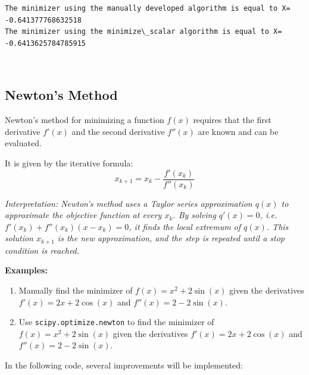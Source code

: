 \documentclass[11pt]{article}
\begin{document}
    \begin{Verbatim}[commandchars=\\\{\}]
The minimizer using the manually developed algorithm is equal to X=
-0.641377768632518
The minimizer using the minimize\_scalar algorithm is equal to X=
-0.6413625784785915
    \end{Verbatim}

    \begin{center}
    \end{center}
    { \hspace*{\fill} \\}
    
    \subsection{Newton's Method}\label{newtons-method}

Newton's method for minimizing a function \(f(x)\) requires that the
first derivative \(f'(x)\) and the second derivative \(f''(x)\) are
known and can be evaluated.

It is given by the iterative formula: \[
x_{k+1} = x_k - \frac{f'(x_k)}{f''(x_k)}
\]

\emph{Interpretation: Newton's method uses a Taylor series approximation
\(q(x)\) to approximate the objective function at every \(x_k\). By
solving \(q'(x) = 0\), i.e.~\(f'(x_k) + f''(x_k)(x - x_k) = 0\), it
finds the local extremum of \(q(x)\). This solution \(x_{k+1}\) is the
new approximation, and the step is repeated until a stop condition is
reached.}

    \textbf{Examples:}

\begin{enumerate}
\def\labelenumi{\arabic{enumi}.}
\item
  Manually find the minimizer of \(f(x) = x^2 + 2\sin(x)\) given the
  derivatives \(f'(x) = 2x + 2\cos(x)\) and \(f''(x) = 2 - 2\sin(x)\).
\item
  Use \texttt{scipy.optimize.newton} to find the minimizer of
  \(f(x) = x^2 + 2\sin(x)\) given the derivatives
  \(f'(x) = 2x + 2\cos(x)\) and \(f''(x) = 2 - 2\sin(x)\).
\end{enumerate}

    In the following code, several improvements will be implemented:
\end{document}

